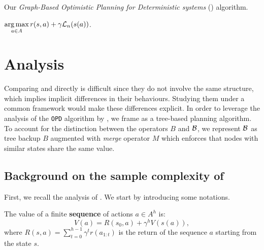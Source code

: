 \documentclass[runningheads]{llncs}
\begin{document}
\begin{algorithm}[th]
	\caption{Our \emph{Graph-Based Optimistic Planning for Deterministic systems} (\GBOPD) algorithm.}
	\label{alg:gbop-d}
	\DontPrintSemicolon
	\Return $\displaystyle\operatorname*{arg\,max}_{a\in A} r(s,a) + \gamma \mathcal{L}_n(s(a))$. 
\end{algorithm}

\section{Analysis}
\label{sec:analysis}

Comparing \OPD and \GBOPD directly is difficult since they do not involve the same structure, which implies implicit differences in their behaviours. Studying them under a common framework would make these differences explicit. In order to leverage the analysis of the \texttt{OPD} algorithm by \citet{Hren2008optimistic}, we frame \GBOPD as a tree-based planning algorithm. To account for the distinction between the operators $B$ and $\mathcal{B}$, we represent $\mathcal{B}$ as tree backup $B$ augmented with \emph{merge} operator $M$ which enforces that nodes with similar states share the same value.

\subsection{Background on the sample complexity of \OPD}

First, we recall the analysis of \citet{Hren2008optimistic}. We start by introducing some notations.

\begin{definition}
The value of a finite \textbf{sequence} of actions $a\in A^h$ is:
\begin{equation*}
\label{eq:state_value}
    V(a) = R(s_0,a) + \gamma^{h} V(s(a)),
\end{equation*}
where $R(s, a) = \sum_{t=0}^{h-1} \gamma^t r(a_{1:t})$ is the return of the sequence $a$ starting from the state $s$.
\end{definition}
\end{document}
